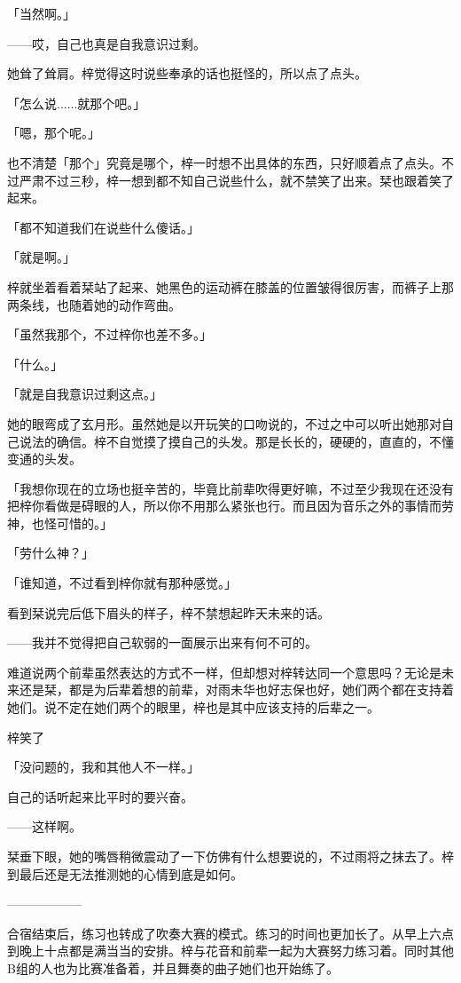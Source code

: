\documentclass[UTF8]{ctexart}
\begin{document}
    「当然啊。」

    ——哎，自己也真是自我意识过剩。

    她耸了耸肩。梓觉得这时说些奉承的话也挺怪的，所以点了点头。

    「怎么说......就那个吧。」

    「嗯，那个呢。」

    也不清楚「那个」究竟是哪个，梓一时想不出具体的东西，只好顺着点了点头。不过严肃不过三秒，梓一想到都不知自己说些什么，就不禁笑了出来。栞也跟着笑了起来。

    「都不知道我们在说些什么傻话。」

    「就是啊。」

    梓就坐着看着栞站了起来、她黑色的运动裤在膝盖的位置皱得很厉害，而裤子上那两条线，也随着她的动作弯曲。

    「虽然我那个，不过梓你也差不多。」

    「什么。」

    「就是自我意识过剩这点。」

    她的眼弯成了玄月形。虽然她是以开玩笑的口吻说的，不过之中可以听出她那对自己说法的确信。梓不自觉摸了摸自己的头发。那是长长的，硬硬的，直直的，不懂变通的头发。

    「我想你现在的立场也挺辛苦的，毕竟比前辈吹得更好嘛，不过至少我现在还没有把梓你看做是碍眼的人，所以你不用那么紧张也行。而且因为音乐之外的事情而劳神，也怪可惜的。」

    「劳什么神？」

    「谁知道，不过看到梓你就有那种感觉。」

    看到栞说完后低下眉头的样子，梓不禁想起昨天未来的话。

    ——我并不觉得把自己软弱的一面展示出来有何不可的。

    难道说两个前辈虽然表达的方式不一样，但却想对梓转达同一个意思吗？无论是未来还是栞，都是为后辈着想的前辈，对雨未华也好志保也好，她们两个都在支持着她们。说不定在她们两个的眼里，梓也是其中应该支持的后辈之一。

    梓笑了

    「没问题的，我和其他人不一样。」

    自己的话听起来比平时的要兴奋。

    ——这样啊。

    栞垂下眼，她的嘴唇稍微震动了一下仿佛有什么想要说的，不过雨将之抹去了。梓到最后还是无法推测她的心情到底是如何。

    ——————

    合宿结束后，练习也转成了吹奏大赛的模式。练习的时间也更加长了。从早上六点到晚上十点都是满当当的安排。梓与花音和前辈一起为大赛努力练习着。同时其他B组的人也为比赛准备着，并且舞奏的曲子她们也开始练了。
\end{document}

